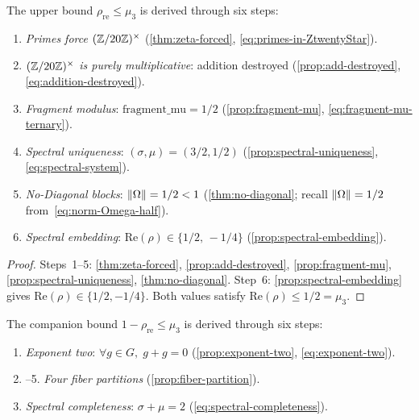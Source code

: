 
\begin{proposition}\label{prop:premise-A}
The upper bound $\rho_{\mathrm{re}}\le\mu_3$ is derived through six
steps:
\begin{enumerate}
  \item \emph{Primes force $(\mathbb{Z}/20\mathbb{Z})^\times$}
    (\cref{thm:zeta-forced}, \cref{eq:primes-in-ZtwentyStar}).
  \item \emph{$(\mathbb{Z}/20\mathbb{Z})^\times$ is purely multiplicative}: addition destroyed
    (\cref{prop:add-destroyed}, \cref{eq:addition-destroyed}).
  \item \emph{Fragment modulus}: $\mathrm{fragment\_mu}=1/2$
    (\cref{prop:fragment-mu}, \cref{eq:fragment-mu-ternary}).
  \item \emph{Spectral uniqueness}: $(\sigma,\mu)=(3/2,1/2)$
    (\cref{prop:spectral-uniqueness},
    \cref{eq:spectral-system}).
  \item \emph{No-Diagonal blocks}: $\|\Omega\|=1/2<1$
    (\cref{thm:no-diagonal}; recall
    $\|\Omega\|=1/2$ from~\cref{eq:norm-Omega-half}).
  \item \emph{Spectral embedding}:
    $\mathrm{Re}(\rho)\in\{1/2,\,-1/4\}$
    (\cref{prop:spectral-embedding}).
\end{enumerate}
\end{proposition}

\begin{proof}
Steps~1--5: \cref{thm:zeta-forced},
\cref{prop:add-destroyed},
\cref{prop:fragment-mu},
\cref{prop:spectral-uniqueness},
\cref{thm:no-diagonal}.
Step~6: \cref{prop:spectral-embedding} gives
$\mathrm{Re}(\rho)\in\{1/2,-1/4\}$.
Both values satisfy $\mathrm{Re}(\rho)\le 1/2 = \mu_3$.
\end{proof}


\begin{proposition}\label{prop:premise-B}
The companion bound $1-\rho_{\mathrm{re}}\le\mu_3$ is derived through
six steps:
\begin{enumerate}
  \item \emph{Exponent two}: $\forall g\in G,\; g+g=0$
    (\cref{prop:exponent-two}, \cref{eq:exponent-two}).
  \item--5. \emph{Four fiber partitions}
    (\cref{prop:fiber-partition}).
  \item[6.] \emph{Spectral completeness}: $\sigma+\mu=2$
    (\cref{eq:spectral-completeness}).
\end{enumerate}
\end{proposition}

